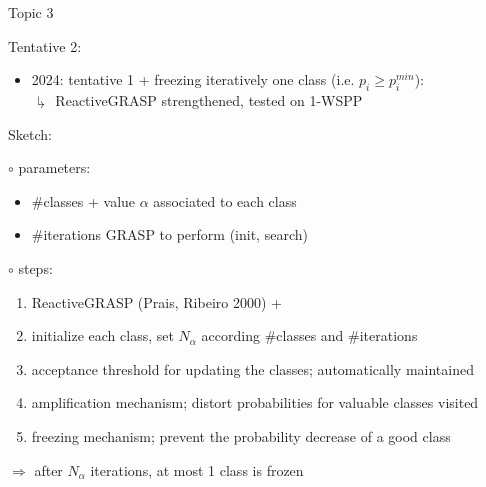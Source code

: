 \documentclass[10pt,xcolor=dvipsnames]{beamer}
\begin{document}
%
%
%
%
%
%
%
%

\begin{frame}{Topic 3}


Tentative 2:
\begin{itemize} 
\item 2024: tentative 1 + freezing iteratively one class (i.e. $p_i \ge p_i^{min}$): \\   
$\drsh$  ReactiveGRASP strengthened, tested on 1-WSPP
\end{itemize}

Sketch:

$\circ$ parameters:\vspace{-3mm}
{\small
\begin{itemize}
\item \#classes + value $\alpha$ associated to each class\vspace{-1mm}
\item \#iterations GRASP to perform (init, search)
\end{itemize}
}

$\circ$ steps:  \vspace{-3mm}
{\small
\begin{enumerate}
\item [] ReactiveGRASP (Prais, Ribeiro 2000) +\vspace{-1mm}
\item initialize each class, set $N_\alpha$ according \#classes and \#iterations\vspace{-1mm}
\item acceptance threshold for updating the classes; automatically maintained\vspace{-1mm}
\item amplification mechanism;  distort probabilities for valuable classes visited\vspace{-1mm}
\item freezing mechanism; prevent the probability decrease of a good class
\end{enumerate}
}

$\Rightarrow$ after $N_\alpha$ iterations, at most 1 class is frozen


\vfill

\end{frame}
\end{document}
